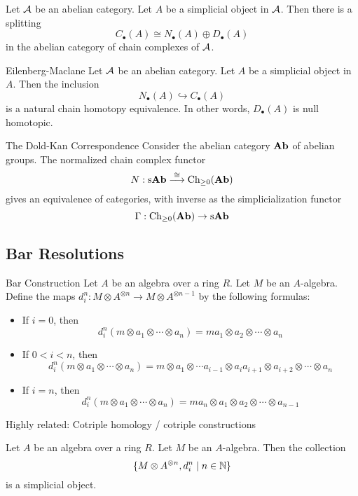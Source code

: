 \documentclass[a4paper]{article}
\begin{document}
\begin{prp}{}{} Let $\mathcal{A}$ be an abelian category. Let $A$ be a simplicial object in $\mathcal{A}$. Then there is a splitting $$C_\bullet(A)\cong N_\bullet(A)\oplus D_\bullet(A)$$ in the abelian category of chain complexes of $\mathcal{A}$. 
\end{prp}

\begin{thm}{Eilenberg-Maclane}{} Let $\mathcal{A}$ be an abelian category. Let $A$ be a simplicial object in $A$. Then the inclusion $$N_\bullet(A)\hookrightarrow C_\bullet(A)$$ is a natural chain homotopy equivalence. In other words, $D_\bullet(A)$ is null homotopic. 
\end{thm}

\begin{thm}{The Dold-Kan Correspondence}{} Consider the abelian category $\bold{Ab}$ of abelian groups. The normalized chain complex functor $$N:\text{s}\bold{Ab}\overset{\cong}{\longrightarrow}\text{Ch}_{\geq 0}(\bold{Ab})$$ gives an equivalence of categories, with inverse as the simplicialization functor $$\Gamma:\text{Ch}_{\geq 0}(\bold{Ab})\to\text{s}\bold{Ab}$$
\end{thm}

\subsection{Bar Resolutions}
\begin{defn}{Bar Construction}{} Let $A$ be an algebra over a ring $R$. Let $M$ be an $A$-algebra. Define the maps $d_i^n:M\otimes A^{\otimes n}\to M\otimes A^{\otimes n-1}$ by the following formulas: 
\begin{itemize}
\item If $i=0$, then $$d_i^n(m\otimes a_1\otimes\cdots\otimes a_n)=ma_1\otimes a_2\otimes\cdots\otimes a_n$$
\item If $0<i<n$, then $$d_i^n(m\otimes a_1\otimes\cdots\otimes a_n)=m\otimes a_1\otimes\cdots a_{i-1}\otimes a_ia_{i+1}\otimes a_{i+2}\otimes\cdots\otimes a_n$$
\item If $i=n$, then $$d_i^n(m\otimes a_1\otimes\cdots\otimes a_n)=ma_n\otimes a_1\otimes a_2\otimes\cdots\otimes a_{n-1}$$
\end{itemize}
\end{defn}

Highly related: Cotriple homology / cotriple constructions

\begin{prp}{}{} Let $A$ be an algebra over a ring $R$. Let $M$ be an $A$-algebra. Then the collection $$\{M\otimes A^{\otimes n},d_i^n\;|\;n\in\mathbb{N}\}$$ is a simplicial object. 
\end{prp}
\end{document}
